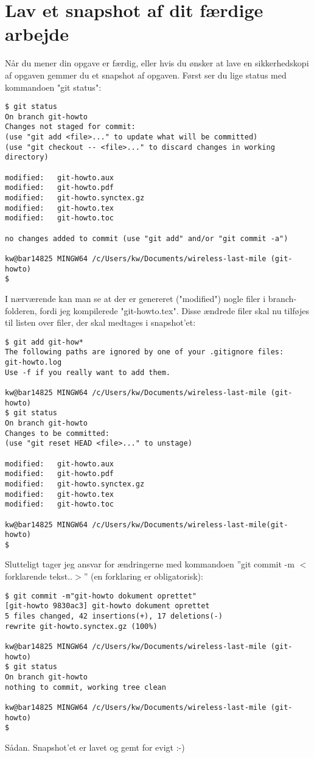 \documentclass[11pt,a4paper,twoside]{report}
\begin{document}
\section{Lav et snapshot af dit færdige arbejde}
Når du mener din opgave er færdig, eller hvis du ønsker at lave en sikkerhedskopi af opgaven gemmer du et snapshot af opgaven. Først ser du lige status med kommandoen "git status":
\begin{verbatim}
$ git status
On branch git-howto
Changes not staged for commit:
(use "git add <file>..." to update what will be committed)
(use "git checkout -- <file>..." to discard changes in working directory)

modified:   git-howto.aux
modified:   git-howto.pdf
modified:   git-howto.synctex.gz
modified:   git-howto.tex
modified:   git-howto.toc

no changes added to commit (use "git add" and/or "git commit -a")

kw@bar14825 MINGW64 /c/Users/kw/Documents/wireless-last-mile (git-howto)
$
\end{verbatim}
I nærværende kan man se at der er genereret ("modified") nogle filer i branch-folderen, fordi jeg kompilerede "git-howto.tex". Disse ændrede filer skal nu tilføjes til listen over filer, der skal medtages i snapshot'et:
\begin{verbatim}
$ git add git-how*
The following paths are ignored by one of your .gitignore files:
git-howto.log
Use -f if you really want to add them.

kw@bar14825 MINGW64 /c/Users/kw/Documents/wireless-last-mile (git-howto)
$ git status
On branch git-howto
Changes to be committed:
(use "git reset HEAD <file>..." to unstage)

modified:   git-howto.aux
modified:   git-howto.pdf
modified:   git-howto.synctex.gz
modified:   git-howto.tex
modified:   git-howto.toc

kw@bar14825 MINGW64 /c/Users/kw/Documents/wireless-last-mile(git-howto)
$
\end{verbatim}

Slutteligt tager jeg ansvar for ændringerne med kommandoen ''git commit -m $<$forklarende tekst..$>$'' (en forklaring er obligatorisk):

\begin{verbatim}
$ git commit -m"git-howto dokument oprettet"
[git-howto 9830ac3] git-howto dokument oprettet
5 files changed, 42 insertions(+), 17 deletions(-)
rewrite git-howto.synctex.gz (100%)

kw@bar14825 MINGW64 /c/Users/kw/Documents/wireless-last-mile (git-howto)
$ git status
On branch git-howto
nothing to commit, working tree clean

kw@bar14825 MINGW64 /c/Users/kw/Documents/wireless-last-mile (git-howto)
$
\end{verbatim}
Sådan. Snapshot'et er lavet og gemt for evigt :-)
\end{document}
